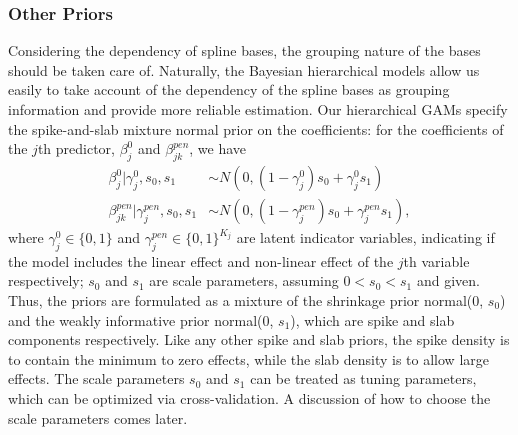 \documentclass[AMA,STIX1COL,]{WileyNJD-v2}
\begin{document}
\hypertarget{other-priors}{%
\subsubsection{Other Priors}\label{other-priors}}

Considering the dependency of spline bases, the grouping nature of the
bases should be taken care of. Naturally, the Bayesian hierarchical
models allow us easily to take account of the dependency of the spline
bases as grouping information and provide more reliable estimation. Our
hierarchical GAMs specify the spike-and-slab mixture normal prior on the
coefficients: for the coefficients of the \(j\)th predictor,
\(\beta^0_j\) and \(\beta^{pen}_{jk}\), we have \[
\begin{aligned}
  \beta^0_{j} |\gamma^0_{j},s_0,s_1 &\sim N(0,(1-\gamma^0_{j}) s_0 + \gamma^0_{j} s_1)\\
  \beta^{pen}_{jk} | \gamma^{pen}_{j},s_0,s_1 &\sim N(0,(1-\gamma^{pen}_{j}) s_0 + \gamma^{pen}_{j} s_1), 
\end{aligned}
\] where \(\gamma^0_{j}\in\{0,1\}\) and
\(\gamma^{pen}_{j}\in \{0,1\}^{K_j}\) are latent indicator variables,
indicating if the model includes the linear effect and non-linear effect
of the \(j\)th variable respectively; \(s_0\) and \(s_1\) are scale
parameters, assuming \(0 < s_0 < s_1\) and given. Thus, the priors are
formulated as a mixture of the shrinkage prior normal(0, \(s_0\)) and
the weakly informative prior normal(0, \(s_1\)), which are spike and
slab components respectively. Like any other spike and slab priors, the
spike density is to contain the minimum to zero effects, while the slab
density is to allow large effects. The scale parameters \(s_0\) and
\(s_1\) can be treated as tuning parameters, which can be optimized via
cross-validation. A discussion of how to choose the scale parameters
comes later.
\end{document}
